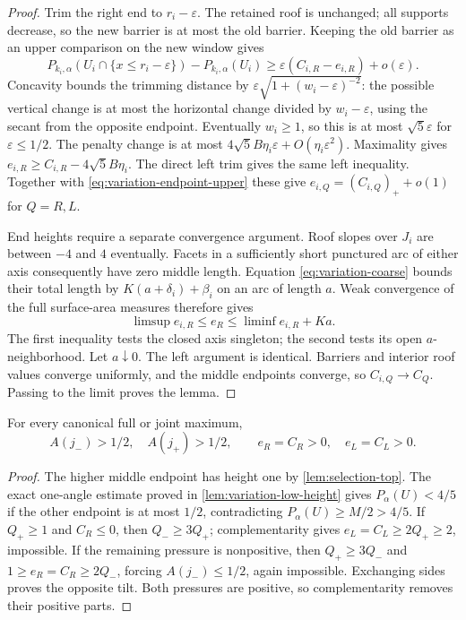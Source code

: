 \begin{proof}
Trim the right end to $r_i-\varepsilon$. The retained roof is unchanged;
all supports decrease, so the new barrier is at most the old barrier.
Keeping the old barrier as an upper comparison on the new window gives
\[
 P_{k_i,\alpha}(U_i\cap\{x\le r_i-\varepsilon\})-P_{k_i,\alpha}(U_i)
 \ge\varepsilon(C_{i,R}-e_{i,R})+o(\varepsilon).
\]
Concavity bounds the trimming distance by
$\varepsilon\sqrt{1+(w_i-\varepsilon)^{-2}}$:
the possible vertical change is at most the horizontal change divided
by $w_i-\varepsilon$, using the secant from the opposite endpoint.
Eventually $w_i\ge1$, so this is at most $\sqrt5\varepsilon$ for
$\varepsilon\le1/2$. The penalty change is at most
$4\sqrt5B\eta_i\varepsilon+O(\eta_i\varepsilon^2)$.
Maximality gives $e_{i,R}\ge C_{i,R}-4\sqrt5B\eta_i$.
The direct left trim gives the same left inequality. Together with
\eqref{eq:variation-endpoint-upper} these give
$e_{i,Q}=(C_{i,Q})_++o(1)$ for $Q=R,L$.

End heights require a separate convergence argument. Roof slopes
over $J_i$ are between $-4$ and $4$ eventually. Facets in a
sufficiently short punctured arc of either axis consequently have
zero middle length. Equation \eqref{eq:variation-coarse} bounds
their total length by $K(a+\delta_i)+\beta_i$ on an arc of
length $a$. Weak convergence of the full surface-area measures
therefore gives
\[
 \limsup e_{i,R}\le e_R\le\liminf e_{i,R}+Ka.
\]
The first inequality tests the closed axis singleton; the second
tests its open $a$-neighborhood. Let $a\downarrow0$.
The left argument is identical. Barriers and interior roof values
converge uniformly, and the middle endpoints converge, so
$C_{i,Q}\to C_Q$. Passing to the limit proves the lemma.
\end{proof}

\begin{lemma}\label{lem:variation-endpoint-pressure}
For every canonical full or joint maximum,
\[
 A(j_-)>1/2,\quad A(j_+)>1/2,\qquad
 e_R=C_R>0,\quad e_L=C_L>0.
\]
\end{lemma}

\begin{proof}
The higher middle endpoint has height one by
\cref{lem:selection-top}. The exact one-angle estimate proved in
\cref{lem:variation-low-height} gives $P_\alpha(U)<4/5$ if the
other endpoint is at most $1/2$, contradicting
$P_\alpha(U)\ge M/2>4/5$.
If $Q_+\ge1$ and $C_R\le0$, then $Q_-\ge3Q_+$;
complementarity gives $e_L=C_L\ge2Q_+\ge2$, impossible.
If the remaining pressure is nonpositive, then
$Q_+\ge3Q_-$ and $1\ge e_R=C_R\ge2Q_-$, forcing
$A(j_-)\le1/2$, again impossible. Exchanging sides proves the
opposite tilt. Both pressures are positive, so complementarity
removes their positive parts.
\end{proof}

